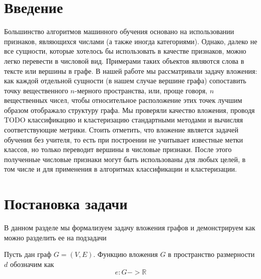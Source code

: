 \documentclass[12pt,a4paper]{extarticle}
\begin{document}
    \tableofcontents

    \newpage

    \section{Введение}
    Большинство алгоритмов машинного обучения основано на использовании
    признаков, являющихся числами (а также иногда категориями).
    Однако, далеко не все сущности, которые хотелось бы использовать в качестве признаков,
    можно легко перевести в числовой вид.
    Примерами таких объектов являются слова в тексте или вершины в графе.
    В нашей работе мы рассматривали задачу вложения: как каждой отдельной сущности (в нашем
    случае вершине графа) сопоставить точку вещественного $n$-мерного пространства,
    или, проще говоря, $n$ вещественных чисел, чтобы относительное
    расположение этих точек лучшим образом отображало структуру графа.
    Мы проверяли качество вложения, проводя TODO классификацию и кластеризацию
    стандартными методами и вычисляя соответствующие метрики.
    Стоить отметить, что вложение является задачей обучения без учителя,
    то есть при построении не учитывает известные метки классов, но только
    переводит вершины в числовые признаки.
    После этого полученные числовые признаки могут быть использованы для любых целей, в том числе и для
    применения в алгоритмах классификации и кластеризации.

    \section{Постановка задачи}
    В данном разделе мы формализуем задачу вложения графов и демонстрируем
    как можно разделить ее на подзадачи

    Пусть дан граф $G = (V, E)$.
    Функцию вложения $G$ в пространство размерности $d$ обозначим как
    \[e: G -> \mathbb{R}\]


    \subsection{}



    
    
\end{document}
